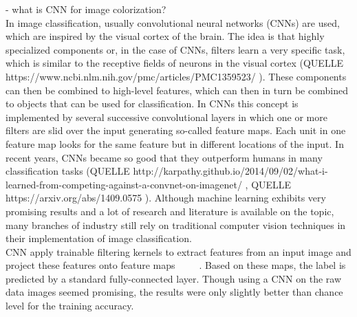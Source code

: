 \documentclass[12pt,letterpaper]{article}
\begin{document}
- what is CNN for image colorization?\\

In image classification, usually convolutional neural networks (CNNs) are used, which are inspired by the visual cortex of the brain. The idea is that highly specialized components or, in the case of CNNs, filters learn a very specific task, which is similar to the receptive fields of neurons in the visual cortex (QUELLE https://www.ncbi.nlm.nih.gov/pmc/articles/PMC1359523/ ). These components can then be combined to high-level features, which can then in turn be combined to objects that can be used for classification. In CNNs this concept is implemented by several successive convolutional layers in which one or more filters are slid over the input generating so-called feature maps. Each unit in one feature map looks for the same feature but in different locations of the input. In recent years, CNNs became so good that they outperform humans in many classification tasks (QUELLE http://karpathy.github.io/2014/09/02/what-i-learned-from-competing-against-a-convnet-on-imagenet/ , QUELLE https://arxiv.org/abs/1409.0575 ). Although machine learning exhibits very promising results and a lot of research and literature is available on the topic, many branches of industry still rely on traditional computer vision techniques in their implementation of image classification.\\

CNN apply trainable filtering kernels to extract features from an input image and project these features onto feature maps ~\citep{geron2019hands} ~\citep{bishop2006pattern} ~\citep{lecun1995convolutional}. Based on these maps, the label is predicted by a standard fully-connected layer.
Though using a CNN on the raw data images seemed promising, the results were only slightly better than chance level for the training accuracy.\\
\end{document}
